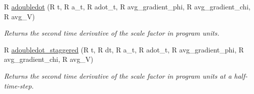 \begin{DoxyCompactItemize}
\item 
R \hyperlink{structmodel__params_ad954a15177ce8ae5cc0d8304967ef772}{adoubledot} (R t, R a\_\-t, R adot\_\-t, R avg\_\-gradient\_\-phi, R avg\_\-gradient\_\-chi, R avg\_\-V)
\begin{DoxyCompactList}\small\item\em Returns the second time derivative of the scale factor in program units. \item\end{DoxyCompactList}\item 
R \hyperlink{structmodel__params_a9406f007166bc0c58dafa5f970687ba8}{adoubledot\_\-staggered} (R t, R dt, R a\_\-t, R adot\_\-t, R avg\_\-gradient\_\-phi, R avg\_\-gradient\_\-chi, R avg\_\-V)
\begin{DoxyCompactList}\small\item\em Returns the second time derivative of the scale factor in program units at a half-\/time-\/step. \item\end{DoxyCompactList}\end{DoxyCompactItemize}
